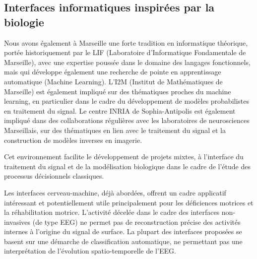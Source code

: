 \documentclass[11pt]{article}
\begin{document}
\subsection{Interfaces informatiques inspirées par la biologie}

Nous avons également à Marseille une forte tradition en informatique théorique, portée
historiquement par le LIF (Laboratoire d'Informatique Fondamentale de Marseille), avec une expertise poussée 
dans le domaine des langages fonctionnels, mais qui développe également une
recherche de pointe en apprentissage automatique (Machine Learning).
L'I2M (Institut de Mathématiques de Marseille) est également impliqué sur des
thématiques proches du machine learning, en particulier dans le cadre du développement de
modèles probabilistes en traitement du signal.
Le centre INRIA de Sophia-Antipolis est également impliqué dans des 
collaborations régulières avec les laboratoires de neurosciences
Marseillais, sur des thématiques en lien avec le traitement du signal et la 
construction de modèles inverses en imagerie.

Cet environnement facilite le développement de projets mixtes, à l'interface du
traitement du signal et de la modélisation biologique dans le cadre de l'étude des
processus décisionnels classiques. 

Les interfaces cerveau-machine, déjà abordées, offrent
un cadre applicatif intéressant et potentiellement utile principalement pour
les déficiences motrices et la réhabilitation motrice.
L'activité décelée dans le cadre des interfaces non-invasives (de type EEG) ne permet pas de reconstruction
précise des activités internes à l'origine du signal de surface. La plupart des interfaces proposées
se basent sur une démarche de classification automatique, ne permettant pas une interprétation
de l'évolution spatio-temporelle de l'EEG. 
\end{document}
